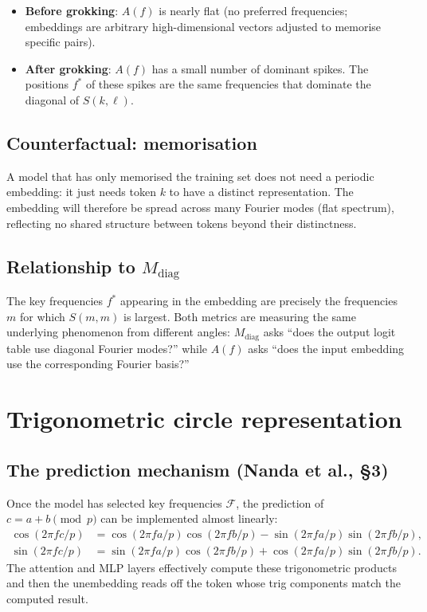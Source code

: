 \documentclass[11pt]{article}
\newcommand{\diag}{\mathrm{diag}}
\begin{document}
\begin{itemize}
    \item \textbf{Before grokking}: $A(f)$ is nearly flat (no preferred
    frequencies; embeddings are arbitrary high-dimensional vectors adjusted
    to memorise specific pairs).
    \item \textbf{After grokking}: $A(f)$ has a small number of dominant
    spikes.
    The positions $f^*$ of these spikes are the same frequencies that
    dominate the diagonal of $S(k,\ell)$.
\end{itemize}

\subsection{Counterfactual: memorisation}

A model that has only memorised the training set does not need a periodic
embedding: it just needs token $k$ to have a distinct representation.
The embedding will therefore be spread across many Fourier modes (flat
spectrum), reflecting no shared structure between tokens beyond their
distinctness.

\subsection{Relationship to $M_{\diag}$}

The key frequencies $f^*$ appearing in the embedding are precisely the
frequencies $m$ for which $S(m,m)$ is largest.
Both metrics are measuring the same underlying phenomenon from different
angles: $M_{\diag}$ asks ``does the output logit table use diagonal Fourier
modes?'' while $A(f)$ asks ``does the input embedding use the corresponding
Fourier basis?''

\section{Trigonometric circle representation}
\label{sec:trig}

\subsection{The prediction mechanism (Nanda et al., §3)}

Once the model has selected key frequencies $\mathcal{F}$, the prediction of
$c = a+b\pmod{p}$ can be implemented almost linearly:
\begin{align}
    \cos(2\pi f c / p)
    &= \cos(2\pi f a/p)\cos(2\pi f b/p) - \sin(2\pi f a/p)\sin(2\pi f b/p),\\
    \sin(2\pi f c / p)
    &= \sin(2\pi f a/p)\cos(2\pi f b/p) + \cos(2\pi f a/p)\sin(2\pi f b/p).
\end{align}
The attention and MLP layers effectively compute these trigonometric products
and then the unembedding reads off the token whose trig components match the
computed result.
\end{document}
